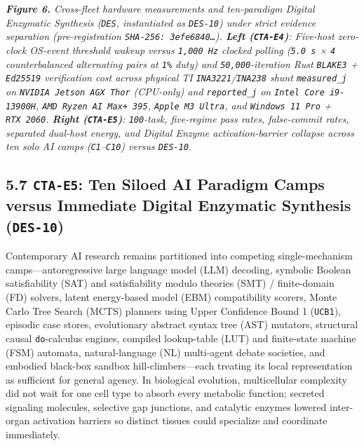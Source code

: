 \documentclass[10pt,letterpaper]{article}
\begin{document}
\emph{\textbf{Figure 6.} Cross-fleet hardware measurements and
ten-paradigm Digital Enzymatic Synthesis (\texttt{DES}, instantiated as
\texttt{DES-10}) under strict evidence separation (pre-registration
\texttt{SHA-\allowbreak{}256:\ 3efe6840…}). \textbf{Left (\texttt{CTA-E4})}:
Five-host zero-clock OS-event threshold wakeup versus \texttt{1,000\ Hz}
clocked polling (\texttt{5.0\ s} × \texttt{4} counterbalanced
alternating pairs at \texttt{1\%} duty) and \texttt{50,000}-iteration
Rust \texttt{BLAKE3} + \texttt{Ed25519} verification cost across
physical TI \texttt{INA3221}/\allowbreak{}\texttt{INA238} shunt \texttt{measured\_\allowbreak{}j}
on \texttt{NVIDIA\ Jetson\ AGX\ Thor} (CPU-only) and
\texttt{reported\_\allowbreak{}j} on \texttt{Intel\ Core\ i9-\allowbreak{}13900H},
\texttt{AMD\ Ryzen\ AI\ Max+\ 395}, \texttt{Apple\ M3\ Ultra}, and
\texttt{Windows\ 11\ Pro} + \texttt{RTX\ 2060}. \textbf{Right
(\texttt{CTA-E5})}: \texttt{100}-task, five-regime pass rates,
false-commit rates, separated dual-host energy, and Digital Enzyme
activation-barrier collapse across ten solo AI camps
(\texttt{C1}--\texttt{C10}) versus \texttt{DES-10}.}

\subsection{\texorpdfstring{5.7 \texttt{CTA-E5}: Ten Siloed AI Paradigm
Camps versus Immediate Digital Enzymatic Synthesis
(\texttt{DES-10})}{5.7 CTA-E5: Ten Siloed AI Paradigm Camps versus Immediate Digital Enzymatic Synthesis (DES-10)}}\label{cta-e5-ten-siloed-ai-paradigm-camps-versus-immediate-digital-enzymatic-synthesis-des-10}

Contemporary AI research remains partitioned into competing
single-mechanism camps---autoregressive large language model (LLM)
decoding, symbolic Boolean satisfiability (SAT) and satisfiability
modulo theories (SMT) / finite-domain (FD) solvers, latent energy-based
model (EBM) compatibility scorers, Monte Carlo Tree Search (MCTS)
planners using Upper Confidence Bound 1 (\texttt{UCB1}), episodic case
stores, evolutionary abstract syntax tree (AST) mutators, structural
causal \texttt{do}-calculus engines, compiled lookup-table (LUT) and
finite-state machine (FSM) automata, natural-language (NL) multi-agent
debate societies, and embodied black-box sandbox hill-climbers---each
treating its local representation as sufficient for general agency. In
biological evolution, multicellular complexity did not wait for one cell
type to absorb every metabolic function; secreted signaling molecules,
selective gap junctions, and catalytic enzymes lowered inter-organ
activation barriers so distinct tissues could specialize and coordinate
immediately.
\end{document}
